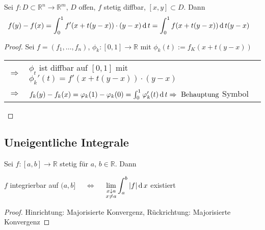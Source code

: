 \begin{proposition}
	Sei $f:D\subset\mathbb{R}^n\to\mathbb{R}^m$, $D$ offen, $f$ stetig \gls{diffbar}, $[x,y]\subset D$. Dann \begin{align*}
		f(y) - f(x) &= \int_0^1 f'(x + t(y - x)) \cdot (y - x) \operatorname{d} t = \int_0^1 f(x + t(y - x)) \operatorname{d} t (y - x)
	\end{align*}
\end{proposition}

\begin{proof}
	\NoEndMark
	Sei $f = (f_1, \dotsc, f_n)$, $\phi_k: [0,1]\to\mathbb{R}$ mit $\phi_k(t) := f_K(x + t(y - x))$ \\\begin{tabularx}{\linewidth}{r@{\ \ }X}
	$\Rightarrow$ & $\phi_t$ ist diffbar auf $[0,1]$ mit $\phi_k'(t) = f'(x + t(y - x)) \cdot (y - x)$ \\
	$\Rightarrow$ & $f_k(y) - f_k(x) = \varphi_k(1) - \varphi_k(0) = \int_0^1 \varphi_k'(t) \operatorname{d} t\Rightarrow \text{ Behauptung}$
	 \hfill\csname\InTheoType Symbol\endcsname
	\end{tabularx}
\end{proof}

\subsection{Uneigentliche Integrale}
\begin{proposition}
	Sei $f:[a,b]\to\mathbb{R}$ stetig für $a$, $b\in\mathbb{R}$. Dann \begin{center}
			$f$ integrierbar auf $(a,b]$ \ \ $\Leftrightarrow$ \ \ $\displaystyle \lim\limits_{\substack{x\downarrow a \\ x\neq a}} \int_a^b \vert f \vert \operatorname{d} x$ existiert
	\end{center}
\end{proposition}
\begin{proof}
	Hinrichtung: Majorisierte Konvergenz, Rückrichtung: Majorisierte Konvergenz
\end{proof}